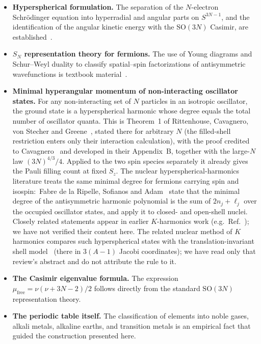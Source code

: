 \documentclass[aps,prl,twocolumn,superscriptaddress,longbibliography]{revtex4-2}
\newcommand{\mufree}{\mu_{\mathrm{free}}}
\begin{document}
\begin{itemize}
  \item \textbf{Hyperspherical formulation.}  The separation of the
    $N$-electron Schr\"odinger equation into hyperradial and angular
    parts on $S^{3N-1}$, and the identification of the angular kinetic
    energy with the $\mathrm{SO}(3N)$ Casimir, are
    established~\cite{Avery2000, Fock1954}.

  \item \textbf{$S_N$ representation theory for fermions.}  The use of
    Young diagrams and Schur--Weyl duality to classify spatial--spin
    factorizations of antisymmetric wavefunctions is textbook
    material~\cite{Weyl1946, FultonHarris1991}.

  \item \textbf{Minimal hyperangular momentum of non-interacting
    oscillator states.}  For any non-interacting set of $N$ particles
    in an isotropic oscillator, the ground state is a hyperspherical
    harmonic whose degree equals the total number of oscillator quanta.
    This is Theorem~1 of Rittenhouse, Cavagnero, von Stecher and
    Greene~\cite{Rittenhouse2006}, stated there for arbitrary $N$ (the
    filled-shell restriction enters only their interaction calculation),
    with the proof credited to Cavagnero~\cite{Cavagnero1986} and
    developed in their Appendix~B, together with the large-$N$ law
    $(3N)^{4/3}/4$.  Applied to the two spin species separately it
    already gives the Pauli filling count at fixed $S_z$.  The nuclear
    hyperspherical-harmonics literature treats the same minimal degree
    for fermions carrying spin and isospin:\ Fabre de la Ripelle,
    Sofianos and Adam~\cite{FabreDeLaRipelle2004} state that the minimal
    degree of the antisymmetric harmonic polynomial is the sum of
    $2n_j + \ell_j$ over the occupied oscillator states, and apply it to
    closed- and open-shell nuclei.  Closely related statements appear in
    earlier $K$-harmonics work (e.g.\ Ref.~\cite{FabreDeLaRipelle1983});
    we have not verified their content here.  The related nuclear
    method of $K$ harmonics compares such hyperspherical states with the
    translation-invariant shell model~\cite{SmirnovShitikova1977} (there
    in $3(A-1)$ Jacobi coordinates); we have read only that review's
    abstract and do not attribute the rule to it.

  \item \textbf{The Casimir eigenvalue formula.}  The expression
    $\mufree = \nu(\nu + 3N - 2)/2$ follows directly from the
    standard $\mathrm{SO}(3N)$ representation theory.

  \item \textbf{The periodic table itself.}  The classification of
    elements into noble gases, alkali metals, alkaline earths, and
    transition metals is an empirical fact that guided the
    construction presented here.
\end{itemize}
\end{document}
